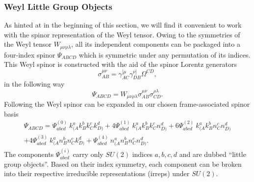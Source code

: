 \subsubsection{Weyl Little Group Objects} \label{5D:sec:WeylSpinorLittleGroupObjects} 
As hinted at in the beginning of this section, we will find it convenient to work with the spinor representation of
the Weyl tensor. Owing to the symmetries of the Weyl tensor $W_{\mu \nu \rho \lambda}$, all its independent components can be packaged into
a four-index spinor $\Psi_{ABCD}$ which is symmetric under any permutation of its indices. This Weyl spinor is constructed with
the aid of the spinor Lorentz generators
%
\begin{equation} \label{5D:SpinorLorentzGeneratorsDefn} 
    \sigma^{\mu \nu}_{AB} = \gamma^{[\mu}_{AC} \gamma^{\nu]}_{DB} \Omega^{CD},
\end{equation}
%
in the following way
%
\begin{equation} \label{5D:WeylSpinorDefn} 
    \Psi_{ABCD} = W_{\mu \nu \rho \lambda} \sigma^{\mu \nu}_{AB} \sigma^{\rho \lambda}_{CD}.
\end{equation}
%
Following \cite{Monteiro:2018xev} the Weyl spinor can be expanded in our chosen frame-associated spinor basis
%
\begin{multline} \label{5D:WeylLittleGroupObjects} 
    \Psi_{ABCD} = \Psi^{(0)}_{abcd}\ k^{a}_{(A} k^{b}_{B} k^{c}_{C} k^{d}_{D)} + 4
    \Psi^{(1)}_{abcd}\ k^{a}_{(A} k^{b}_{B} k^{c}_{C} n^{d}_{D)} + 6 \Psi^{(2)}_{abcd}\
    k^{a}_{(A} k^{b}_{B} n^{c}_{C} n^{d}_{D)} \\
    + 4 \Psi^{(3)}_{abcd}\ k^{a}_{(A} n^{b}_{B}
    n^{c}_{C} k^{d}_{D)} + \Psi^{(4)}_{abcd}\ n^{a}_{(A} n^{b}_{B} n^{c}_{C} n^{d}_{D)}.
\end{multline}
%
The components $\Psi^{(i)}_{abcd}$ carry only $SU(2)$ indices ${a,b,c,d}$ and are dubbed ``little group objects''. Based on their index symmetry, each component can be broken into their
respective irreducible representations (irreps) under $SU(2)$.

